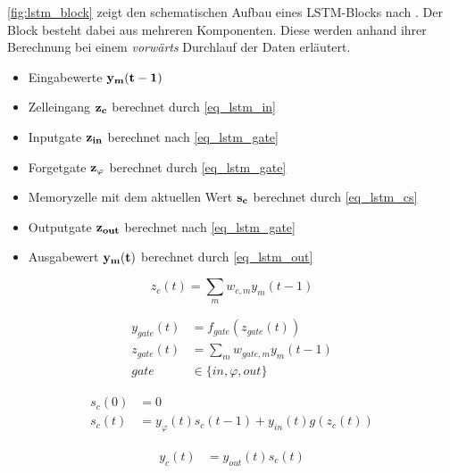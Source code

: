 \autoref{fig:lstm_block} zeigt den schematischen Aufbau eines \ac{LSTM}-Blocks
nach \cite{Gers2002b}. Der Block besteht dabei aus mehreren Komponenten. Diese
werden anhand ihrer Berechnung bei einem \textit{vorwärts} Durchlauf der Daten
erläutert.
\begin{itemize}
	\item Eingabewerte $\bf y_m(t-1)$
	\item Zelleingang $\bf z_c$ berechnet durch \autoref{eq_lstm_in}
	\item Inputgate $\bf z_{in}$ berechnet nach \autoref{eq_lstm_gate}
	\item Forgetgate $\bf z_\varphi$ berechnet durch \autoref{eq_lstm_gate}
	\item Memoryzelle mit dem aktuellen Wert $\bf s_c$ berechnet durch
	\autoref{eq_lstm_cs}
	\item Outputgate $\bf z_{out}$ berechnet nach \autoref{eq_lstm_gate}
	\item Ausgabewert $\bf y_m(t)$ berechnet durch \autoref{eq_lstm_out}
\end{itemize}

\begin{equation}
\label{eq_lstm_in}
z_{c}(t) = \sum \limits_{m} w_{c,m}y_m(t-1)
\end{equation}

\begin{equation}
\label{eq_lstm_gate}
\begin{split}
y_{gate}(t) &= f_{gate}(z_{gate}(t))\\
z_{gate}(t) &= \sum \limits_{m} w_{gate,m}y_m(t-1)\\
gate &\in \{in,\varphi,out\}
\end{split}
\end{equation}

\begin{equation}
\label{eq_lstm_cs}
\begin{split}
s_{c}(0) &= 0\\
s_{c}(t) &= y_{\varphi}(t)s_{c}(t-1) +
y_{in}(t)g(z_{c}(t))
\end{split}
\end{equation}

\begin{equation}
\label{eq_lstm_out}
\begin{split}
y_{c}(t) &= y_{out}(t)s_{c}(t)\\
\end{split}
\end{equation}

